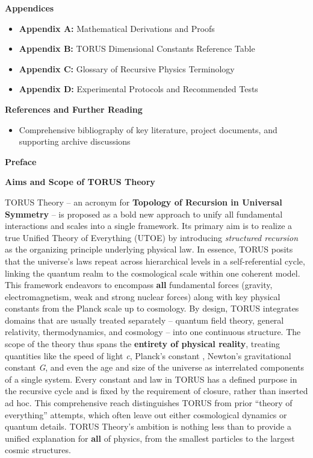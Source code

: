 \documentclass[
]{article}
\begin{document}
\textbf{Appendices}

\begin{itemize}
\item
  \textbf{Appendix A:} Mathematical Derivations and Proofs
\item
  \textbf{Appendix B:} TORUS Dimensional Constants Reference Table
\item
  \textbf{Appendix C:} Glossary of Recursive Physics Terminology
\item
  \textbf{Appendix D:} Experimental Protocols and Recommended Tests
\end{itemize}

\textbf{References and Further Reading}

\begin{itemize}
\item
  Comprehensive bibliography of key literature, project documents, and
  supporting archive discussions
\end{itemize}

\textbf{Preface}

\textbf{Aims and Scope of TORUS Theory}

TORUS Theory -- an acronym for \textbf{Topology of Recursion in
Universal Symmetry} -- is proposed as a bold new approach to unify all
fundamental interactions and scales into a single framework. Its primary
aim is to realize a true Unified Theory of Everything (UTOE) by
introducing \emph{structured recursion} as the organizing principle
underlying physical law. In essence, TORUS posits that the universe's
laws repeat across hierarchical levels in a self-referential cycle,
linking the quantum realm to the cosmological scale within one coherent
model. This framework endeavors to encompass \textbf{all} fundamental
forces (gravity, electromagnetism, weak and strong nuclear forces) along
with key physical constants from the Planck scale up to
cosmology\hspace{0pt}. By design, TORUS integrates domains that are
usually treated separately -- quantum field theory, general relativity,
thermodynamics, and cosmology -- into one continuous structure. The
scope of the theory thus spans the \textbf{entirety of physical
reality}, treating quantities like the speed of light \emph{c}, Planck's
constant \emph{\hbar}, Newton's gravitational constant \emph{G}, and even
the age and size of the universe as interrelated components of a single
system. Every constant and law in TORUS has a defined purpose in the
recursive cycle and is fixed by the requirement of closure, rather than
inserted ad hoc\hspace{0pt}. This comprehensive reach distinguishes
TORUS from prior ``theory of everything'' attempts, which often leave
out either cosmological dynamics or quantum details. TORUS Theory's
ambition is nothing less than to provide a unified explanation for
\textbf{all} of physics, from the smallest particles to the largest
cosmic structures\hspace{0pt}.
\end{document}
